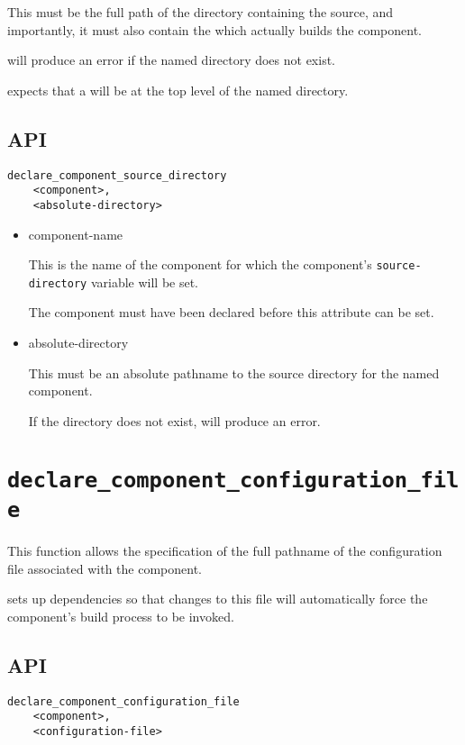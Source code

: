 This must be the full path of the directory containing the source, and
importantly, it must also contain the \makefile which actually builds
the component.

\lmsbw will produce an error if the named directory does not exist.

\lmsbw expects that a \makefile will be at the top level of the named
directory.

\subsection{API}

\begin{verbatim}
declare_component_source_directory
    <component>,
    <absolute-directory>
\end{verbatim}

\begin{itemize}
\item component-name

  This is the name of the component for which the component's
  \texttt{source-directory} variable will be set.

  The component must have been declared before this attribute can be
  set.

\item absolute-directory

  This must be an absolute pathname to the source directory for the
  named component.

  If the directory does not exist, \lmsbw will produce an error.
\end{itemize}

\section{\texttt{declare\_component\_configuration\_file}}\label{api:configuration-file}

This function allows the specification of the full pathname of the
configuration file associated with the component.

\lmsbw sets up dependencies so that changes to this file will
automatically force the component's build process to be invoked.

\subsection{API}

\begin{verbatim}
declare_component_configuration_file
    <component>,
    <configuration-file>
\end{verbatim}


